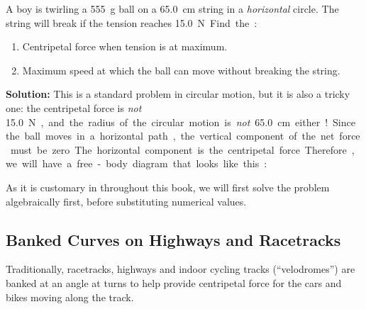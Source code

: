 \begin{example}
  A boy is twirling a \SI{555}{\gram} ball on a \SI{65.0}{\centi\metre}
  string in a \emph{horizontal} circle. The string will break if the tension
  reaches \SI{15.0}\newton. Find the:
  \begin{enumerate}[label=(\alph*),itemsep=4pt]
  \item Centripetal force when tension is at maximum.
  \item Maximum speed at which the ball can move without breaking the string.
  \end{enumerate}

  \vspace{.1in}\textbf{Solution:} This is a standard problem in circular
  motion, but it is also a tricky one: the centripetal force is \emph{not}
  \SI{15.0}\newton, and the radius of the circular motion is \emph{not}
  \SI{65.0}{\centi\metre} either! Since the ball moves in a horizontal path,
  the vertical component of the net force must be zero. The horizontal
  component is the centripetal force. Therefore, we will have a free-body
  diagram that looks like this:
  \begin{center}
  \end{center}
  As it is customary in throughout this book, we will first solve the problem
  algebraically first, before substituting numerical values.

\end{example}



\subsection{Banked Curves on Highways and Racetracks}

Traditionally, racetracks, highways and indoor cycling tracks (``velodromes'')
are banked at an angle at turns to help provide centripetal force for the cars
and bikes moving along the track. %

